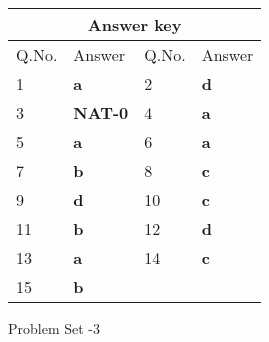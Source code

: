 \setlength\arrayrulewidth{1pt}
\begin{table}[H]
	\centering

	\begin{tabular}{|p{1.5cm}|p{1.5cm}||p{1.5cm}|p{1.5cm}|}
		\hline
		\multicolumn{4}{|c|}{\textbf{Answer key}}\\\hline\hline
	\rowcolor{ocrel}Q.No.&Answer&Q.No.&Answer\\\hline
		1&\textbf{a}&2&\textbf{d}\\\hline 
		3&\textbf{NAT-0}&4&\textbf{a}\\\hline
		5&\textbf{a}&6&\textbf{a}\\\hline
		7&\textbf{b}&8&\textbf{c}\\\hline
		9&\textbf{d}&10&\textbf{c}\\\hline
		11&\textbf{b}&12&\textbf{d}\\\hline
		13&\textbf{a}&14&\textbf{c}\\\hline
		15&\textbf{b}&&\\\hline
	\end{tabular}
\end{table}
 \newpage
\begin{abox}
	Problem Set -3
\end{abox}
